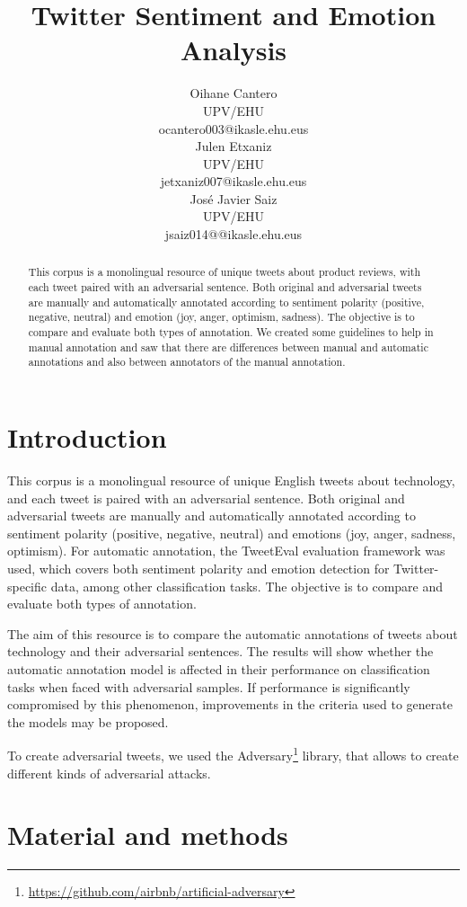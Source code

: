 \documentclass[11pt,a4paper]{article}
\title{Twitter Sentiment and Emotion Analysis}
\author{Oihane Cantero \\
  UPV/EHU \\
  ocantero003@ikasle.ehu.eus \\\And
  Julen Etxaniz \\
  UPV/EHU \\
  jetxaniz007@ikasle.ehu.eus \\\And
  José Javier Saiz \\
  UPV/EHU \\
  jsaiz014@@ikasle.ehu.eus \\}
\date{}
\begin{document}
\maketitle
\begin{abstract}
This corpus is a monolingual resource of unique tweets about product reviews, with each tweet paired with an adversarial sentence. Both original and adversarial tweets are manually and automatically annotated according to sentiment polarity (positive, negative, neutral) and emotion (joy, anger, optimism, sadness). The objective is to compare and evaluate both types of annotation. We created some guidelines to help in manual annotation and saw that there are differences between manual and automatic annotations and also between annotators of the manual annotation.
\end{abstract}

\section{Introduction}

This corpus is a monolingual resource of unique English tweets about technology, and each tweet is paired with an adversarial sentence. Both original and adversarial tweets are manually and automatically annotated according to sentiment polarity (positive, negative, neutral) and emotions (joy, anger, sadness, optimism). For automatic annotation, the TweetEval \cite{barbieri-etal-2020-tweeteval} evaluation framework  was used, which covers both sentiment polarity and emotion detection for Twitter-specific data, among other classification tasks. The objective is to compare and evaluate both types of annotation.

The aim of this resource is to compare the automatic annotations of tweets about technology and their adversarial sentences. The results will show whether the automatic annotation model is affected in their performance on classification tasks when faced with adversarial samples. If performance is significantly compromised by this phenomenon, improvements in the criteria used to generate the models may be proposed.

To create adversarial tweets, we used the Adversary\footnote{\url{https://github.com/airbnb/artificial-adversary}} library, that allows to create different kinds of adversarial attacks.

\section{Material and methods}
\end{document}
